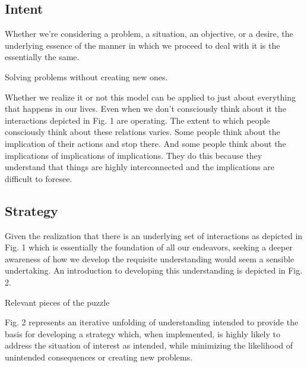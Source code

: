 \documentclass[]{memoir}
\begin{document}
\subsection{Intent}

Whether we're considering a problem, a situation, an objective, or a
desire, the underlying essence of the manner in which we proceed to deal
with it is the essentially the same.

\FloatBarrier 

\begin{model}[frametitle={Model: The Future We Create}] 

 Solving problems without creating new ones.




 \end{model}

Whether we realize it or not this model can be applied to just about
everything that happens in our lives. Even when we don't consciously
think about it the interactions depicted in Fig. 1 are operating. The
extent to which people consciously think about these relations varies.
Some people think about the implication of their actions and stop there.
And some people think about the implications of implications of
implications. They do this because they understand that things are
highly interconnected and the implications are difficult to foresee.

\subsection{Strategy}

Given the realization that there is an underlying set of interactions as
depicted in Fig. 1 which is essentially the foundation of all our
endeavors, seeking a deeper awareness of how we develop the requisite
understanding would seem a sensible undertaking. An introduction to
developing this understanding is depicted in Fig. 2.

\FloatBarrier 

\begin{model}[frametitle={Model: Systemic Strategy}] 

 Relevant pieces of the puzzle




 \end{model}

Fig. 2 represents an iterative unfolding of understanding intended to
provide the basis for developing a strategy which, when implemented, is
highly likely to address the situation of interest as intended, while
minimizing the likelihood of unintended consequences or creating new
problems.
\end{document}

